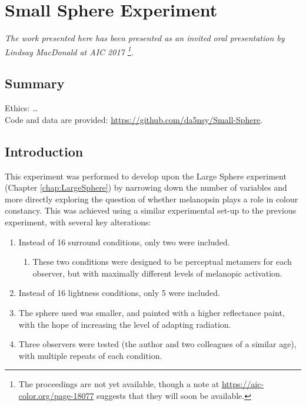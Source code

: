\chapter{Small Sphere Experiment}
\label{chap:SmallSphere}

\textit{The work presented here has been presented as an invited oral presentation by Lindsay MacDonald at AIC 2017 \citep{macdonald_melanopsin_2017}\footnote{The proceedings are not yet available, though a note at \url{https://aic-color.org/page-18077} suggests that they will soon be available.}.}


\section{Summary}

Ethics: \dots \\
Code and data are provided: \url{https://github.com/da5nsy/Small-Sphere}.

\section{Introduction}


This experiment was performed to develop upon the Large Sphere experiment (Chapter \ref{chap:LargeSphere}) by narrowing down the number of variables and more directly exploring the question of whether melanopsin plays a role in colour constancy. This was achieved using a similar experimental set-up to the previous experiment, with several key alterations:

\begin{enumerate}
    \item Instead of 16 surround conditions, only two were included.
    \begin{enumerate}
        \item These two conditions were designed to be perceptual metamers for each observer, but with maximally different levels of melanopic activation.
    \end{enumerate}
    \item Instead of 16 lightness conditions, only 5 were included.
    \item The sphere used was smaller, and painted with a higher reflectance paint, with the hope of increasing the level of adapting radiation.
    \item Three observers were tested (the author and two colleagues of a similar age), with multiple repeats of each condition.
\end{enumerate}

